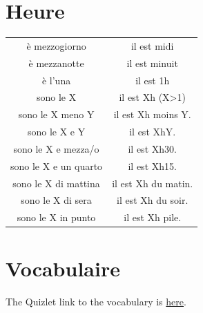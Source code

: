 \documentclass[12pt, openany]{report}
\begin{document}
\section{Heure}
\begin{center}
    \begin{tabular}{c|c}
        è mezzogiorno  & il est midi\\
        è mezzanotte & il est minuit\\
        è l'una & il est 1h\\
        sono le X & il est Xh (X>1)\\
        sono le X meno Y & il est Xh moins Y.\\
        sono le X e Y & il est XhY.\\
        sono le X e mezza/o & il est Xh30.\\
        sono le X e un quarto & il est Xh15.\\
        sono le X di mattina & il est Xh du matin.\\
        sono le X di sera & il est Xh du soir.\\
        sono le X in punto & il est Xh pile.\\
    \end{tabular}
\end{center}
\section{Vocabulaire}
The Quizlet link to the vocabulary is \hyperlink{https://quizlet.com/be/1006471421/lital1100-q2-flash-cards/}{here}.
\end{document}
